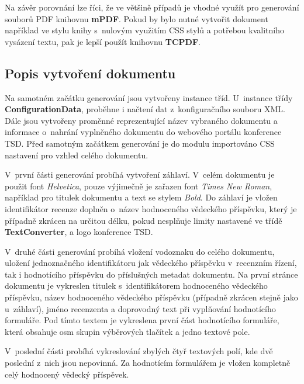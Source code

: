 \par
Na závěr porovnání lze říci, že ve většině případů je vhodné využít pro generování souborů PDF knihovnu \textbf{mPDF}. Pokud by bylo nutné vytvořit dokument například ve stylu knihy s~nulovým využitím CSS stylů a potřebou kvalitního vysázení textu, pak je lepší použít knihovnu \textbf{TCPDF}. 

\subsection{Popis vytvoření dokumentu}
Na samotném začátku generování jsou vytvořeny instance tříd. U~instance třídy \textbf{ConfigurationData}, proběhne i načtení dat z~konfiguračního souboru XML. Dále jsou vytvořeny proměnné reprezentující název vybraného dokumentu a informace o~nahrání vyplněného dokumentu do webového portálu konference TSD. Před samotným začátkem generování je do modulu importováno CSS nastavení pro vzhled celého dokumentu.
\par
V~první části generování probíhá vytvoření záhlaví. V~celém dokumentu je použit font \textit{Helvetica}, pouze výjimečně je zařazen font \textit{Times New Roman}, například pro titulek dokumentu a text se stylem \textit{Bold}. Do záhlaví je vložen identifikátor recenze doplněn o~název hodnoceného vědeckého příspěvku, který je případně zkrácen na určitou délku, pokud nesplňuje limity nastavené ve třídě \textbf{TextConverter}, a logo konference TSD. 
\par
V~druhé části generování probíhá vložení vodoznaku do celého dokumentu, uložení jednoznačného identifikátoru jak vědeckého příspěvku v~recenzním řízení, tak i hodnotícího příspěvku do příslušných metadat dokumentu. Na první stránce dokumentu je vykreslen titulek s~identifikátorem hodnoceného vědeckého příspěvku, název hodnoceného vědeckého příspěvku (případně zkrácen stejně jako u~záhlaví), jméno recenzenta a doprovodný text při vyplňování hodnotícího formuláře. Pod tímto textem je vykreslena první část hodnotícího formuláře, která obsahuje osm skupin výběrových tlačítek a jedno textové pole.
\par
V~poslední části probíhá vykreslování zbylých čtyř textových polí, kde dvě poslední z~nich jsou nepovinná. Za hodnotícím formulářem je vložen kompletně celý hodnocený vědecký příspěvek.
